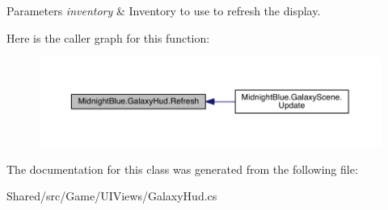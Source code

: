 \begin{DoxyParams}{Parameters}
{\em inventory} & Inventory to use to refresh the display.\\
\hline
\end{DoxyParams}
Here is the caller graph for this function\+:
\nopagebreak
\begin{figure}[H]
\begin{center}
\leavevmode
\includegraphics[width=350pt]{class_midnight_blue_1_1_galaxy_hud_aea2d04b212188a2e729ea327b7da0449_icgraph}
\end{center}
\end{figure}


The documentation for this class was generated from the following file\+:\begin{DoxyCompactItemize}
\item 
Shared/src/\+Game/\+U\+I\+Views/Galaxy\+Hud.\+cs\end{DoxyCompactItemize}
